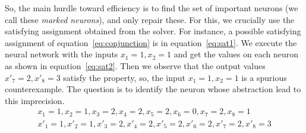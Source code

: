 So, the main hurdle toward efficiency is to find the set of important neurons (we call these {\em marked neurons}), 
and only repair these.  For this, we crucially use the satisfying assignment obtained from the \milp{} solver.
For instance, a possible satisfying assignment of equation~\ref{eq:conjunction}
is in equation~\ref{eq:sat1}. We execute the neural network with the inputs $x_1=1,x_2=1$ and get the values 
on each neuron as shown in equation~\ref{eq:sat2}. 
Then we observe that the output values $x'_7=2, x'_8=3$ satisfy the property, 
so, the input $x_1=1, x_2=1$ is a spurious counterexample. 
The question is to identify the neuron whose abstraction lead to this imprecision.
\setcounter{equation}{2}
\begin{align}
  x_1=1, x_2=1, x_3=2, x_4=2, x_5=2, x_6=0, x_7=2, x_8=1 \label{eq:sat1} \\
  x'_1=1, x'_2=1, x'_3=2, x'_4=2, x'_5=2, x'_6=2, x'_7=2, x'_8=3 \label{eq:sat2}
\end{align}





